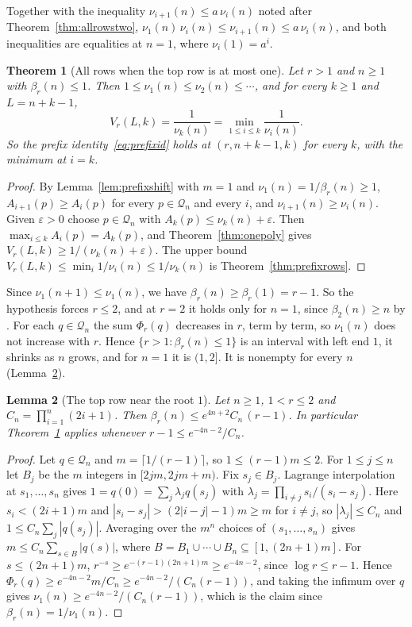 \documentclass[11pt]{article}
\newtheorem{theorem}{Theorem}[section]
\newtheorem{lemma}[theorem]{Lemma}
\begin{document}
Together with the inequality $\nu_{i+1}(n)\le a\,\nu_i(n)$ noted after
Theorem~\ref{thm:allrowstwo},
$\nu_1(n)\,\nu_i(n)\le\nu_{i+1}(n)\le a\,\nu_i(n)$, and both inequalities are
equalities at $n=1$, where $\nu_i(1)=a^i$.

\begin{theorem}[All rows when the top row is at most one]\label{thm:onepolyrows}
Let $r>1$ and $n\ge1$ with $\beta_r(n)\le1$.  Then
$1\le\nu_1(n)\le\nu_2(n)\le\cdots$, and for every $k\ge1$ and $L=n+k-1$,
\[
  V_r(L,k)=\frac1{\nu_k(n)}=\min_{1\le i\le k}\frac1{\nu_i(n)} .
\]
So the prefix identity~\eqref{eq:prefixid} holds at $(r,n+k-1,k)$
for every $k$, with the minimum at $i=k$.
\end{theorem}

\begin{proof}
By Lemma~\ref{lem:prefixshift} with $m=1$ and $\nu_1(n)=1/\beta_r(n)\ge1$,
$A_{i+1}(p)\ge A_i(p)$ for every $p\in\mathcal Q_n$ and every $i$, and
$\nu_{i+1}(n)\ge\nu_i(n)$.  Given $\varepsilon>0$ choose $p\in\mathcal Q_n$
with $A_k(p)\le\nu_k(n)+\varepsilon$.  Then
$\max_{i\le k}A_i(p)=A_k(p)$, and Theorem~\ref{thm:onepoly} gives
$V_r(L,k)\ge1/(\nu_k(n)+\varepsilon)$.  The upper bound
$V_r(L,k)\le\min_i1/\nu_i(n)\le1/\nu_k(n)$ is Theorem~\ref{thm:prefixrows}.
\end{proof}

Since $\nu_1(n+1)\le\nu_1(n)$, we have $\beta_r(n)\ge\beta_r(1)=r-1$.  So the
hypothesis forces $r\le2$, and at $r=2$ it holds only for $n=1$, since
$\beta_2(n)\ge n$ by \cite[Theorem~4.13]{coefficient-mass}.  For each
$q\in\mathcal Q_n$ the sum $\Phi_r(q)$ decreases in $r$, term by term, so
$\nu_1(n)$ does not increase with $r$.  Hence
$\{r>1:\beta_r(n)\le1\}$ is an interval with left end $1$, it shrinks as $n$
grows, and for $n=1$ it is $(1,2]$.  It is nonempty for every $n$ (Lemma~\ref{lem:topnearone}).

\begin{lemma}[The top row near the root $1$]\label{lem:topnearone}
Let $n\ge1$, $1<r\le2$ and $C_n=\prod_{i=1}^n(2i+1)$.  Then
$\beta_r(n)\le e^{4n+2}C_n\,(r-1)$.  In particular Theorem~\ref{thm:onepolyrows}
applies whenever $r-1\le e^{-4n-2}/C_n$.
\end{lemma}

\begin{proof}
Let $q\in\mathcal Q_n$ and $m=\lceil1/(r-1)\rceil$, so $1\le(r-1)m\le2$.
For $1\le j\le n$ let $B_j$ be the $m$ integers in $[2jm,2jm+m)$.  Fix
$s_j\in B_j$.  Lagrange interpolation at $s_1,\ldots,s_n$ gives
$1=q(0)=\sum_j\lambda_jq(s_j)$ with
$\lambda_j=\prod_{i\ne j}s_i/(s_i-s_j)$.  Here $s_i<(2i+1)m$ and
$|s_i-s_j|>(2|i-j|-1)m\ge m$ for $i\ne j$, so $|\lambda_j|\le C_n$ and
$1\le C_n\sum_j|q(s_j)|$.  Averaging over the $m^n$ choices of
$(s_1,\ldots,s_n)$ gives $m\le C_n\sum_{s\in B}|q(s)|$, where
$B=B_1\cup\cdots\cup B_n\subseteq[1,(2n+1)m]$.  For $s\le(2n+1)m$,
$r^{-s}\ge e^{-(r-1)(2n+1)m}\ge e^{-4n-2}$, since $\log r\le r-1$.  Hence
$\Phi_r(q)\ge e^{-4n-2}m/C_n\ge e^{-4n-2}/(C_n(r-1))$, and taking the
infimum over $q$ gives $\nu_1(n)\ge e^{-4n-2}/(C_n(r-1))$, which is the
claim since $\beta_r(n)=1/\nu_1(n)$.
\end{proof}
\end{document}

